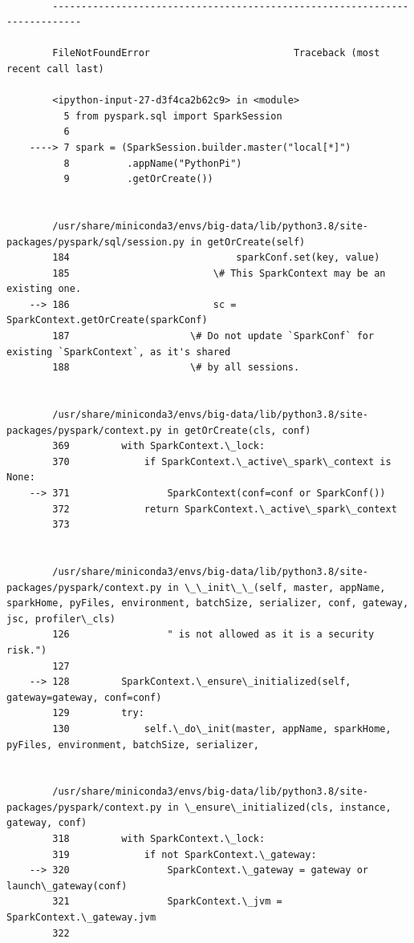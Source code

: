 \documentclass[11pt]{article}
\begin{document}
    \begin{Verbatim}[commandchars=\\\{\}]

        ---------------------------------------------------------------------------

        FileNotFoundError                         Traceback (most recent call last)

        <ipython-input-27-d3f4ca2b62c9> in <module>
          5 from pyspark.sql import SparkSession
          6 
    ----> 7 spark = (SparkSession.builder.master("local[*]")
          8          .appName("PythonPi")
          9          .getOrCreate())


        /usr/share/miniconda3/envs/big-data/lib/python3.8/site-packages/pyspark/sql/session.py in getOrCreate(self)
        184                             sparkConf.set(key, value)
        185                         \# This SparkContext may be an existing one.
    --> 186                         sc = SparkContext.getOrCreate(sparkConf)
        187                     \# Do not update `SparkConf` for existing `SparkContext`, as it's shared
        188                     \# by all sessions.


        /usr/share/miniconda3/envs/big-data/lib/python3.8/site-packages/pyspark/context.py in getOrCreate(cls, conf)
        369         with SparkContext.\_lock:
        370             if SparkContext.\_active\_spark\_context is None:
    --> 371                 SparkContext(conf=conf or SparkConf())
        372             return SparkContext.\_active\_spark\_context
        373 


        /usr/share/miniconda3/envs/big-data/lib/python3.8/site-packages/pyspark/context.py in \_\_init\_\_(self, master, appName, sparkHome, pyFiles, environment, batchSize, serializer, conf, gateway, jsc, profiler\_cls)
        126                 " is not allowed as it is a security risk.")
        127 
    --> 128         SparkContext.\_ensure\_initialized(self, gateway=gateway, conf=conf)
        129         try:
        130             self.\_do\_init(master, appName, sparkHome, pyFiles, environment, batchSize, serializer,


        /usr/share/miniconda3/envs/big-data/lib/python3.8/site-packages/pyspark/context.py in \_ensure\_initialized(cls, instance, gateway, conf)
        318         with SparkContext.\_lock:
        319             if not SparkContext.\_gateway:
    --> 320                 SparkContext.\_gateway = gateway or launch\_gateway(conf)
        321                 SparkContext.\_jvm = SparkContext.\_gateway.jvm
        322 



\end{Verbatim}
\end{document}
